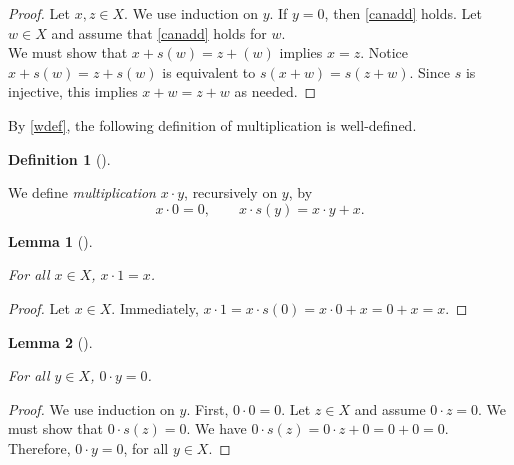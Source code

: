 \documentclass[
  letterpaper,
  10pt,
  reqno,
  twopage,
  openany]{book}
\theoremstyle{plain}
\newtheorem{lemma}{Lemma}[chapter]
\theoremstyle{definition}
\theoremstyle{definition}
\newtheorem{definition}{Definition}[chapter]
\theoremstyle{definition}
\theoremstyle{plain}
\theoremstyle{plain}
\theoremstyle{remark}
\begin{document}
\begin{proof}

Let \(x,z\in X\). We use induction on \(y\). If \(y=0\), then
\eqref{canadd} holds. Let \(w\in X\) and assume that \eqref{canadd}
holds for \(w\).\\
We must show that \(x+s(w)=z+(w)\) implies \(x=z\). Notice
\(x+s(w)=z+s(w)\) is equivalent to \(s(x+w)=s(z+w)\). Since \(s\) is
injective, this implies \(x+w=z+w\) as needed.

\end{proof}

By \ref{wdef}, the following definition of multiplication is
well-defined.

\leavevmode{}%
\begin{definition}[]\label{def-}

We define \emph{multiplication} \(x\cdot y\), recursively on \(y\), by
\begin{equation}
x\cdot 0=0, \qquad x\cdot s(y)=x\cdot y +x.
\end{equation}

\end{definition}

\leavevmode{}%
\begin{lemma}[]\label{lem-}

For all \(x\in X\), \(x\cdot 1=x\).

\end{lemma}

\begin{proof}

Let \(x\in X\). Immediately, \(x\cdot 1=x\cdot s(0)=x\cdot 0+x=0+x=x\).

\end{proof}

\leavevmode{}%
\begin{lemma}[]\label{lem-}

For all \(y\in X\), \(0\cdot y=0\).

\end{lemma}

\begin{proof}

We use induction on \(y\). First, \(0\cdot 0=0\). Let \(z\in X\) and
assume \(0\cdot z=0\). We must show that \(0\cdot s(z)=0\). We have
\(0\cdot s(z)=0\cdot z +0=0+0=0\). Therefore, \(0\cdot y=0\), for all
\(y\in X\).

\end{proof}
\end{document}
